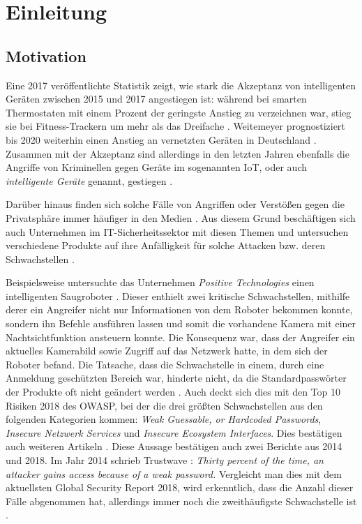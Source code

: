\chapter{Einleitung} %

\section{Motivation}
Eine 2017 veröffentlichte Statistik zeigt, wie stark die Akzeptanz von intelligenten Geräten zwischen 2015 und 2017 angestiegen ist: während bei smarten Thermostaten mit einem Prozent der geringste Anstieg zu verzeichnen war, stieg sie bei Fitness-Trackern um mehr als das Dreifache \cite{nier_2017}. Weitemeyer prognostiziert bis 2020 weiterhin einen Anstieg an vernetzten Geräten in Deutschland \cite{weitemeyer_2018}.
Zusammen mit der Akzeptanz sind allerdings in den letzten Jahren ebenfalls die Angriffe von Kriminellen gegen Geräte im sogenannten \ac{IoT}, oder auch \emph{intelligente Geräte} genannt, gestiegen \cite{statista_2019}.

Darüber hinaus finden sich solche Fälle von Angriffen oder Verstößen gegen die Privatsphäre immer häufiger in den Medien \cite{holland_2016,it_verlag_informationstechnik_gmbh_2018}. Aus diesem Grund beschäftigen sich auch Unternehmen im IT-Sicherheitssektor mit diesen Themen und untersuchen verschiedene Produkte auf ihre Anfälligkeit für solche Attacken bzw. deren Schwachstellen \cite{lorenz_2018,ao_kaspersky_lab_2018}.

Beispielsweise untersuchte das Unternehmen \emph{Positive Technologies} einen intelligenten Saugroboter \cite{salmi_2017}.
Dieser enthielt zwei kritische Schwachstellen, mithilfe derer ein Angreifer nicht nur Informationen von dem Roboter bekommen konnte, sondern ihn Befehle ausführen lassen und somit die vorhandene Kamera mit einer Nachtsichtfunktion ansteuern konnte. Die Konsequenz war, dass der Angreifer ein aktuelles Kamerabild sowie Zugriff auf das Netzwerk hatte, in dem sich der Roboter befand. Die Tatsache, dass die Schwachstelle in einem, durch eine Anmeldung geschützten Bereich war, hinderte nicht, da die Standardpasswörter der Produkte oft nicht geändert werden \cite{positive_technologies_2018}.
Auch deckt sich dies mit den Top 10 Risiken 2018 des \ac{OWASP}, bei der die drei größten Schwachstellen aus den folgenden Kategorien kommen: \emph{Weak Guessable, or Hardcoded Passwords}, \emph{Insecure Netzwerk Services} und \emph{Insecure Ecosystem Interfaces}. Dies bestätigen auch weiteren Artikeln \cite{guzman_2019,eckstein_2018}.
Diese Aussage bestätigen auch zwei Berichte aus 2014 und 2018.
Im Jahr 2014 schrieb Trustwave \cite{trustwave_holdings_inc_2014}: \emph{Thirty percent of the time, an attacker gains access because of a weak password.}
Vergleicht man dies mit dem aktuellsten Global Security Report 2018, wird erkenntlich, dass die Anzahl dieser Fälle abgenommen hat, allerdings immer noch die zweithäufigste Schwachstelle ist \cite{trustwave_holdings_inc_2018}.

